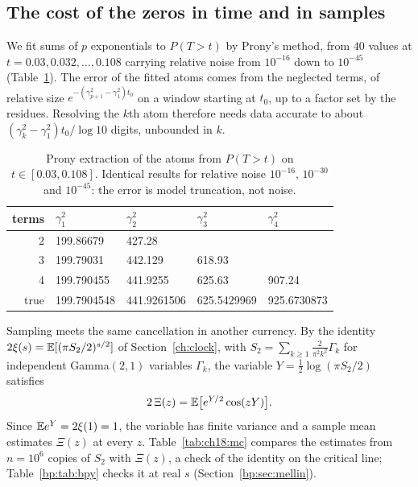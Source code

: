 \subsection{The cost of the zeros in time and in samples}\label{sec:ch18:reach}

We fit sums of $p$ exponentials to $P(T>t)$ by Prony's method, from $40$ values at $t=0.03,0.032,\dots,0.108$ carrying relative noise from $10^{-16}$ down to $10^{-45}$ (Table~\ref{tab:prony}). The error of the fitted atoms comes from the neglected terms, of relative size $e^{-(\gamma_{p+1}^2-\gamma_1^2)t_0}$ on a window starting at $t_0$, up to a factor set by the residues. Resolving the $k$th atom therefore needs data accurate to about $(\gamma_k^2-\gamma_1^2)t_0/\log10$ digits, unbounded in $k$.

\begin{table}[t]
\centering\small
\begin{tabular}{rllll}
\toprule
terms & $\gamma_1^2$ & $\gamma_2^2$ & $\gamma_3^2$ & $\gamma_4^2$\\
\midrule
2 & 199.86679 & 427.28 & & \\
3 & 199.79031 & 442.129 & 618.93 & \\
4 & 199.790455 & 441.9255 & 625.63 & 907.24\\
\midrule
true & 199.7904548 & 441.9261506 & 625.5429969 & 925.6730873\\
\bottomrule
\end{tabular}
\caption{Prony extraction of the atoms from $P(T>t)$ on $t\in[0.03,0.108]$. Identical results for relative noise $10^{-16}$, $10^{-30}$ and $10^{-45}$: the error is model truncation, not noise.}
\label{tab:prony}
\end{table}

Sampling meets the same cancellation in another currency. By the identity $2\xi(s)=\mathbb{E}[(\pi S_2/2)^{s/2}]$ of Section~\ref{ch:clock}, with $S_2=\sum_{k\ge1}\frac2{\pi^2k^2}\Gamma_k$ for independent Gamma$(2,1)$ variables $\Gamma_k$, the variable $Y=\frac12\log(\pi S_2/2)$ satisfies
\[
2\,\Xi(z)=\mathbb{E}\big[e^{Y/2}\cos(zY)\big].
\]
Since $\mathbb{E} e^{Y}=2\xi(1)=1$, the variable has finite variance and a sample mean estimates $\Xi(z)$ at every $z$. Table~\ref{tab:ch18:mc} compares the estimates from $n=10^6$ copies of $S_2$ with $\Xi(z)$, a check of the identity on the critical line; Table~\ref{bp:tab:bpy} checks it at real $s$ (Section~\ref{bp:sec:mellin}).

